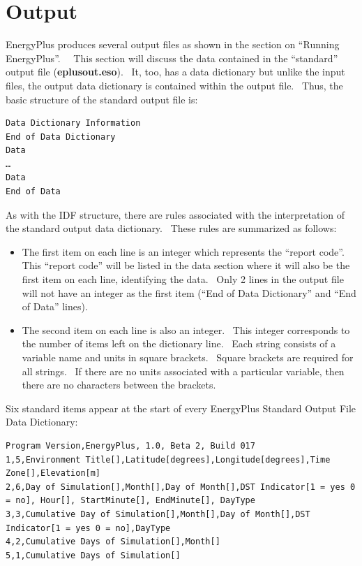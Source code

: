 \chapter{Output}\label{output}

EnergyPlus produces several output files as shown in the section on ``Running EnergyPlus''.~~ This section will discuss the data contained in the ``standard'' output file (\textbf{eplusout.eso}).~ It, too, has a data dictionary but unlike the input files, the output data dictionary is contained within the output file.~ Thus, the basic structure of the standard output file is:

\begin{lstlisting}
Data Dictionary Information
End of Data Dictionary
Data
…
Data
End of Data
\end{lstlisting}

As with the IDF structure, there are rules associated with the interpretation of the standard output data dictionary.~ These rules are summarized as follows:

\begin{itemize}
\item
  The first item on each line is an integer which represents the ``report code''.~ This ``report code'' will be listed in the data section where it will also be the first item on each line, identifying the data.~ Only 2 lines in the output file will not have an integer as the first item (``End of Data Dictionary'' and ``End of Data'' lines).
\item
  The second item on each line is also an integer.~ This integer corresponds to the number of items left on the dictionary line.~ Each string consists of a variable name and units in square brackets.~ Square brackets are required for all strings.~ If there are no units associated with a particular variable, then there are no characters between the brackets.
\end{itemize}

Six standard items appear at the start of every EnergyPlus Standard Output File Data Dictionary:

\begin{lstlisting}
Program Version,EnergyPlus, 1.0, Beta 2, Build 017
1,5,Environment Title[],Latitude[degrees],Longitude[degrees],Time Zone[],Elevation[m]
2,6,Day of Simulation[],Month[],Day of Month[],DST Indicator[1 = yes 0 = no], Hour[], StartMinute[], EndMinute[], DayType
3,3,Cumulative Day of Simulation[],Month[],Day of Month[],DST Indicator[1 = yes 0 = no],DayType
4,2,Cumulative Days of Simulation[],Month[]
5,1,Cumulative Days of Simulation[]
\end{lstlisting}

